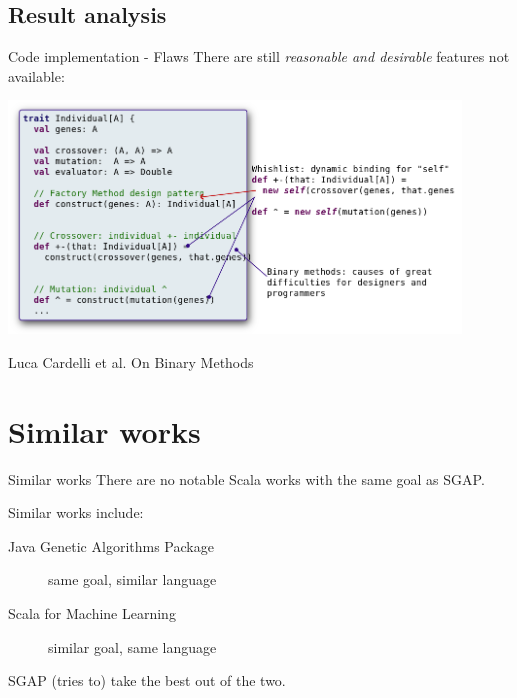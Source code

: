 \documentclass{beamer}
\begin{document}
\subsection{Result analysis}
\begin{frame}{Code implementation - Flaws}
  There are still \emph{reasonable and desirable} features not available:
  \begin{center}
    \includegraphics[width=0.9\textwidth]{images/ga-flaws}
  \end{center}
  \footnotesize{
    \begin{thebibliography}{99}
       Luca Cardelli et al.
      \newblock On Binary Methods
    \end{thebibliography}
  }
\end{frame}



\section{Similar works}
\begin{frame}{Similar works}
  There are no notable Scala works with the same goal as SGAP.
  
  Similar works include:
  \begin{description}
    \item[Java Genetic Algorithms Package] same goal, similar language
    \item[Scala for Machine Learning] similar goal, same language
  \end{description}
  SGAP (tries to) take the best out of the two.
\end{frame}


\end{document}
